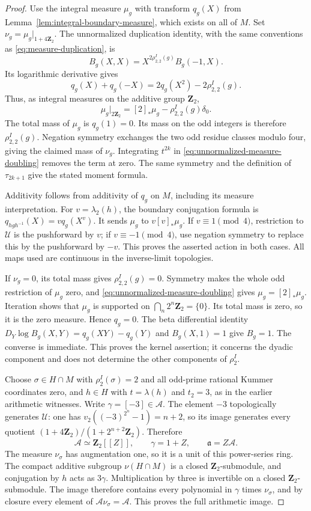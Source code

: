 \begin{proof}
Use the integral measure $\mu_g$ with transform $q_g(X)$ from
Lemma~\ref{lem:integral-boundary-measure}, which exists on all of $M$.
Set $\nu_g=\mu_g|_{1+4\mathbf Z_2}$. The unnormalized duplication
identity, with the same conventions as
\eqref{eq:measure-duplication}, is
\[
 B_g(X,X)=X^{2\rho_{2,2}^I(g)}B_g(-1,X).
\]
Its logarithmic derivative gives
\[
 q_g(X)+q_g(-X)=2q_g(X^2)-2\rho_{2,2}^I(g).
\]
Thus, as integral measures on the additive group $\mathbf Z_2$,
\begin{equation}\label{eq:unnormalized-measure-doubling}
 \mu_g|_{2\mathbf Z_2}=[2]_*\mu_g-\rho_{2,2}^I(g)\delta_0.
\end{equation}
The total mass of $\mu_g$ is $q_g(1)=0$. Its mass on the odd
integers is therefore $\rho_{2,2}^I(g)$. Negation symmetry exchanges
the two odd residue classes modulo four, giving the claimed mass of
$\nu_g$. Integrating $t^{2k}$ in
\eqref{eq:unnormalized-measure-doubling} removes the term at zero.
The same symmetry and the definition of $\tau_{2k+1}$ give the
stated moment formula.

Additivity follows from additivity of $q_g$ on $M$, including its
measure interpretation. For $v=\lambda_2(h)$, the boundary
conjugation formula is $q_{hgh^{-1}}(X)=v q_g(X^v)$.
It sends $\mu_g$ to $v[v]_*\mu_g$. If $v\equiv1\pmod4$,
restriction to $\mathcal U$ is the pushforward by $v$; if
$v\equiv-1\pmod4$, use negation symmetry to replace this by the
pushforward by $-v$. This proves the asserted action in both cases.
All maps used are continuous in the inverse-limit topologies.

If $\nu_g=0$, its total mass gives $\rho_{2,2}^I(g)=0$.
Symmetry makes the whole odd restriction of $\mu_g$ zero, and
\eqref{eq:unnormalized-measure-doubling} gives
$\mu_g=[2]_*\mu_g$. Iteration shows that $\mu_g$ is supported on
$\bigcap_n2^n\mathbf Z_2=\{0\}$. Its total mass is zero, so it is
the zero measure. Hence $q_g=0$. The beta differential identity
$D_Y\log B_g(X,Y)=q_g(XY)-q_g(Y)$ and $B_g(X,1)=1$ give $B_g=1$.
The converse is immediate. This proves the kernel assertion; it
concerns the dyadic component and does not determine the other
components of $\rho_2^I$.

Choose $\sigma\in H\cap M$ with $\rho_2^I(\sigma)=2$ and all
odd-prime rational Kummer coordinates zero, and $h\in H$ with
$t=\lambda(h)$ and $t_2=3$, as in the earlier arithmetic witnesses.
Write $\gamma=[-3]\in\mathcal A$. The element $-3$ topologically
generates $\mathcal U$: one has
$v_2((-3)^{2^n}-1)=n+2$, so its image generates every quotient
$(1+4\mathbf Z_2)/(1+2^{n+2}\mathbf Z_2)$. Therefore
\[
 \mathcal A\simeq\mathbf Z_2[[Z]],\qquad \gamma=1+Z,
 \qquad \mathfrak a=Z\mathcal A.
\]
The measure $\nu_\sigma$ has augmentation one, so it is a unit of
this power-series ring. The compact additive subgroup
$\nu(H\cap M)$ is a closed $\mathbf Z_2$-submodule, and
conjugation by $h$ acts as $3\gamma$. Multiplication by three is
invertible on a closed $\mathbf Z_2$-submodule. The image therefore
contains every polynomial in $\gamma$ times $\nu_\sigma$, and by
closure every element of $\mathcal A\nu_\sigma=\mathcal A$.
This proves the full arithmetic image.


\end{proof}
